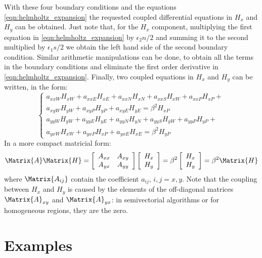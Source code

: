 With these four boundary conditions and the equations
\ref{eqn:helmholtz_expansion} the requested coupled differential
equations in $H_x$ and $H_y$ can be obtained. Just note that, for the
$H_x$ component, multiplying the first equation in
\ref{eqn:helmholtz_expansion} by $\epsilon_2 n/2$ and summing it to
the second multiplied by $\epsilon_1 s/2$ we obtain the left hand side
of the second boundary condition. Similar arithmetic manipulations
can be done, to obtain all the terms in the boundary conditions and
eliminate the first order derivative in \ref{eqn:helmholtz_expansion}.
Finally, two coupled equations in $H_x$ and $H_y$ can be written, in
the form:
\begin{equation}
  \left\{
  \begin{array}{l}
    a_{xxW} H_{xW} + a_{xxE} H_{xE} + a_{xxN} H_{xN} + a_{xxS} H_{xW}
    + a_{xxP} H_{xP} + \\
    a_{xyW} H_{yW} + a_{xyP} H_{yP} + a_{xyE} H_{yE} = \beta^2 H_{xP} \\
    a_{yyW} H_{yW} + a_{yyE} H_{yE} + a_{yyN} H_{yN} + a_{yyS} H_{yW}
    + a_{yyP} H_{yP} + \\
    a_{yxW} H_{xW} + a_{yxP} H_{xP} + a_{yxE} H_{xE} = \beta^2 H_{yP}
  \end{array}
  \right.
\end{equation}
In a more compact matricial form:
\begin{equation}
  \Matrix{A} \Matrix{H} = \left[
    \begin{array}{cc}
      A_{xx} & A_{xy} \\
      A_{yx} & A_{yy}
    \end{array} \right]
  \left[ \begin{array}{c}
      H_x \\
      H_y
    \end{array} \right] = \beta^2
  \left[ \begin{array}{c}
      H_x \\
      H_y
    \end{array} \right] = \beta^2 \Matrix{H}
\end{equation}
where $\Matrix{A_{ij}}$ contain the coefficient $a_{ij}$, $i,j =
x,y$. Note that the coupling between $H_x$ and $H_y$ is caused by the
elements of the off-diagonal matrices $\Matrix{A}_{xy}$ and
$\Matrix{A}_{yx}$: in semivectorial algorithms or for homogeneous
regions, they are the zero.

\section{Examples}

